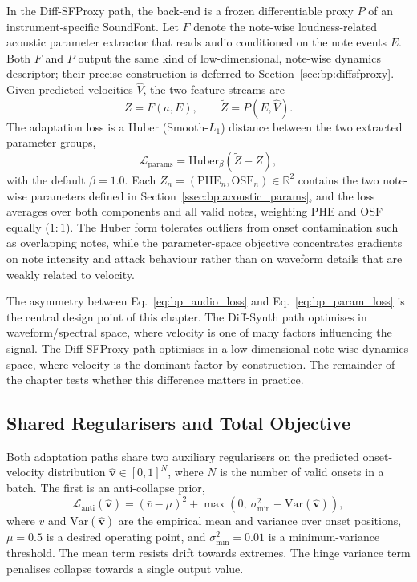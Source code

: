 In the Diff-SFProxy path, the back-end is a frozen differentiable proxy $P$ of an instrument-specific SoundFont. Let $F$ denote the note-wise loudness-related acoustic parameter extractor that reads audio conditioned on the note events $E$. Both $F$ and $P$ output the same kind of low-dimensional, note-wise dynamics descriptor; their precise construction is deferred to Section~\ref{sec:bp:diffsfproxy}. Given predicted velocities $\hat{V}$, the two feature streams are
\begin{equation}
\label{eq:bp_sfproxy_features}
Z = F(a, E), \qquad \tilde{Z} = P(E, \hat{V}).
\end{equation}
The adaptation loss is a Huber (Smooth-$L_1$) distance between the two extracted parameter groups,
\begin{equation}
\label{eq:bp_param_loss}
\mathcal{L}_{\mathrm{params}} = \mathrm{Huber}_\beta\!\left(\tilde{Z} - Z\right),
\end{equation}
with the default $\beta = 1.0$. Each $Z_n = (\mathrm{PHE}_n, \mathrm{OSF}_n) \in \mathbb{R}^2$ contains the two note-wise parameters defined in Section~\ref{ssec:bp:acoustic_params}, and the loss averages over both components and all valid notes, weighting PHE and OSF equally ($1{:}1$). The Huber form tolerates outliers from onset contamination such as overlapping notes, while the parameter-space objective concentrates gradients on note intensity and attack behaviour rather than on waveform details that are weakly related to velocity.

The asymmetry between Eq.~\eqref{eq:bp_audio_loss} and Eq.~\eqref{eq:bp_param_loss} is the central design point of this chapter. The Diff-Synth path optimises in waveform/spectral space, where velocity is one of many factors influencing the signal. The Diff-SFProxy path optimises in a low-dimensional note-wise dynamics space, where velocity is the dominant factor by construction. The remainder of the chapter tests whether this difference matters in practice.

\subsection{Shared Regularisers and Total Objective}
\label{ssec:bp:regularisers}

Both adaptation paths share two auxiliary regularisers on the predicted onset-velocity distribution $\hat{\mathbf{v}} \in [0,1]^{N}$, where $N$ is the number of valid onsets in a batch. The first is an anti-collapse prior,
\begin{equation}
\label{eq:bp_anti_loss}
\mathcal{L}_{\mathrm{anti}}(\hat{\mathbf{v}}) = (\bar{v} - \mu)^2
+ \max\!\left(0,\ \sigma_{\min}^2 - \mathrm{Var}(\hat{\mathbf{v}})\right),
\end{equation}
where $\bar{v}$ and $\mathrm{Var}(\hat{\mathbf{v}})$ are the empirical mean and variance over onset positions, $\mu = 0.5$ is a desired operating point, and $\sigma_{\min}^2 = 0.01$ is a minimum-variance threshold. The mean term resists drift towards extremes. The hinge variance term penalises collapse towards a single output value.


